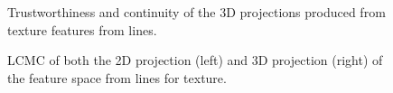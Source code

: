 \begin{figure}[H]
	\centering
	\caption{Trustworthiness and continuity of the 3D projections produced from texture features from lines.}\label{fig:TC_3d_texture}
\end{figure}

\begin{figure}[H]
	\centering
	\caption{LCMC of both the 2D projection (left) and 3D projection (right) of the feature space from lines for texture.}\label{fig:LCMC_texture}
\end{figure}
\clearpage


